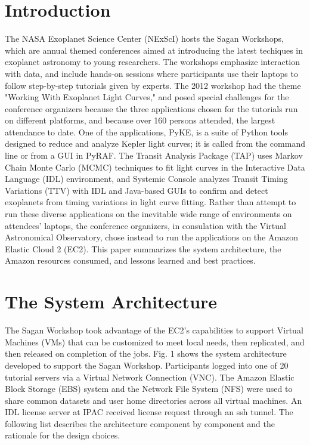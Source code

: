 \section{Introduction}
The NASA Exoplanet Science Center (NExScI) hosts the Sagan Workshops, which are annual themed conferences aimed at introducing the latest techiques in exoplanet astronomy to young researchers. The workshops emphasize interaction with data, and include hands-on sessions where participants use their laptops to follow step-by-step tutorials given by experts.  The 2012 workshop had the theme "Working With Exoplanet Light Curves," and posed special challenges for the conference organizers because the  three applications chosen for the tutorials run on different platforms, and because over 160 persons attended,  the largest attendance to date. One of the applications, PyKE, is a suite of Python tools designed to reduce and analyze Kepler light curves; it is called from the command line or from a GUI in PyRAF. The Transit Analysis Package (TAP) uses Markov Chain Monte Carlo (MCMC) techniques to fit light curves in the Interactive Data Language (IDL) environment, and Systemic Console analyzes Transit Timing Variations (TTV) with IDL and Java-based GUIs to confirm and detect exoplanets from timing variations in light curve fitting.  Rather than attempt to run these diverse applications on the inevitable wide range of environments on attendees' laptops, the conference organizers, in consulation with the Virtual Astronomical Observatory, chose instead to run the applications on the Amazon Elastic Cloud 2 (EC2). This paper summarizes the system architecture, the Amazon resources consumed, and lessons learned and best practices.

\section{The System Architecture}

The Sagan Workshop took advantage of the EC2's capabilities to support Virtual Machines (VMs) that can be customized to meet local needs, then replicated, and then released on completion of the jobs. Fig. 1 shows the system architecture developed to support the Sagan Workshop. Participants logged into one of 20 tutorial servers via a Virtual Network Connection (VNC). The Amazon Elastic Block Storage (EBS) system and the Network File System (NFS) were used to share common datasets and user home directories across all virtual machines. An IDL license server at IPAC received license request through an ssh tunnel. The following list describes the architecture component by component and the rationale for the design choices.


